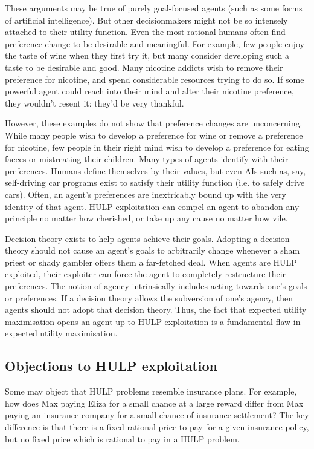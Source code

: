 \documentclass{article}
\begin{document}
These arguments may be true of purely goal-focused agents (such as some forms of artificial intelligence). But other decisionmakers might not be so intensely attached to their utility function. Even the most rational humans often find preference change to be desirable and meaningful. For example, few people enjoy the taste of wine when they first try it, but many consider developing such a taste to be desirable and good. Many nicotine addicts wish to remove their preference for nicotine, and spend considerable resources trying to do so. If some powerful agent could reach into their mind and alter their nicotine preference, they wouldn't resent it: they'd be very thankful.

However, these examples do not show that preference changes are unconcerning. While many people wish to develop a preference for wine or remove a preference for nicotine, few people in their right mind wish to develop a preference for eating faeces or mistreating their children. Many types of agents identify with their preferences. Humans define themselves by their values, but even AIs such as, say, self-driving car programs exist to satisfy their utility function (i.e. to safely drive cars). Often, an agent's preferences are inextricably bound up with the very identity of that agent. HULP exploitation can compel an agent to abandon any principle no matter how cherished, or take up any cause no matter how vile. 

Decision theory exists to help agents achieve their goals. Adopting a decision theory should not cause an agent's goals to arbitrarily change whenever a sham priest or shady gambler offers them a far-fetched deal. When agents are HULP exploited, their exploiter can force the agent to completely restructure their preferences. The notion of agency intrinsically includes acting towards one's goals or preferences. If a decision theory allows the subversion of one's agency, then agents should not adopt that decision theory. Thus, the fact that expected utility maximisation opens an agent up to HULP exploitation is a fundamental flaw in expected utility maximisation.

\subsection{Objections to HULP exploitation}

Some may object that HULP problems resemble insurance plans. For example, how does Max paying Eliza for a small chance at a large reward differ from Max paying an insurance company for a small chance of insurance settlement? The key difference is that there is a fixed rational price to pay for a given insurance policy, but no fixed price which is rational to pay in a HULP problem.
\end{document}
